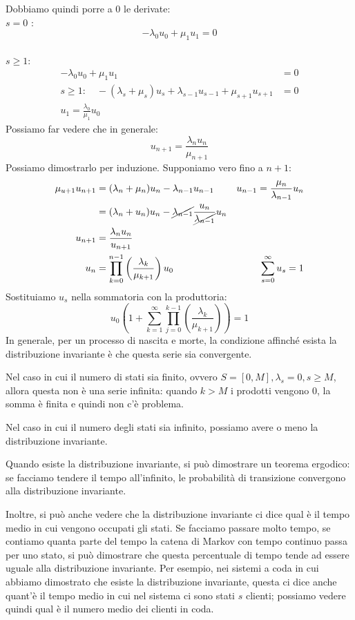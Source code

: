 \documentclass[a4paper,12pt]{book}
\begin{document}
Dobbiamo quindi porre a 0 le derivate:
\\
$ s=0 $ :
 $$ -\lambda_0 u_0 + \mu_1 u_1 = 0 $$
\\
$ s \ge 1 $:
\begin{align*}
	-\lambda_0 u_0 + \mu_1 u_1 & = 0 \\
	s \ge 1: \quad -(\lambda_s + \mu_s)u_s + \lambda_{s-1} u_{s-1} + \mu_{s+1} u_{s+1} & = 0 \\
	u_1 = \frac{\lambda_0}{\mu_1} u_0  
\end{align*}
Possiamo far vedere che in generale: 
$$ u_{n+1} = \frac{\lambda_n u_n}{\mu_{n+1}}$$
Possiamo dimostrarlo per induzione. Supponiamo vero fino a $ n+1 $:
\begin{align*}
\mu_{u+1} u_{n+1} & = (\lambda_n + \mu_n)u_n - \lambda_{n-1}u_{n-1} & u_{n-1} = \frac{\mu_n}{\lambda_{n-1}} u_n\\
	& = (\lambda_n + u_n)u_n - \cancel{\lambda_{n-1}}\frac{u_n}{\cancel{\lambda_{n-1}}}u_n \\
	u_{n+1} & = \frac{\lambda_n u_n}{u_{n+1}} \\
	u_n & = \prod_{k=0}^{n-1} \left(\frac{\lambda_k}{\mu_{k+1}}\right)u_0 & \sum_{s=0}^{\infty}u_s = 1
\end{align*}
Sostituiamo $ u_s $ nella sommatoria con la produttoria:
$$ u_0 \left( 1 + \sum_{k=1}^{\infty} \prod_{j=0}^{k-1} \left( \frac{\lambda_k}{\mu_{k+1}} \right) \right) = 1 $$
In generale, per un processo di nascita e morte, la condizione affinché esista la distribuzione invariante è che questa serie sia convergente. 

Nel caso in cui il numero di stati sia finito, ovvero $ S = [0, M], \lambda_s = 0, s \ge M $, allora questa non è una serie infinita: quando $ k > M $ i prodotti vengono 0, la somma è finita e quindi non c'è problema. 

Nel caso in cui il numero degli stati sia infinito, possiamo avere o meno la distribuzione invariante. 

Quando esiste la distribuzione invariante, si può dimostrare un teorema ergodico: se facciamo tendere il tempo all'infinito, le probabilità di transizione convergono alla distribuzione invariante. 

Inoltre, si può anche vedere che la distribuzione invariante ci dice qual è il tempo medio in cui vengono occupati gli stati. Se facciamo passare molto tempo, se contiamo quanta parte del tempo la catena di Markov con tempo continuo passa per uno stato, si può dimostrare che questa percentuale di tempo tende ad essere uguale alla distribuzione invariante. Per esempio, nei sistemi a coda in cui abbiamo dimostrato che esiste la distribuzione invariante, questa ci dice anche quant'è il tempo medio in cui nel sistema ci sono stati $ s $ clienti; possiamo vedere quindi qual è il numero medio dei clienti in coda. 
\end{document}
